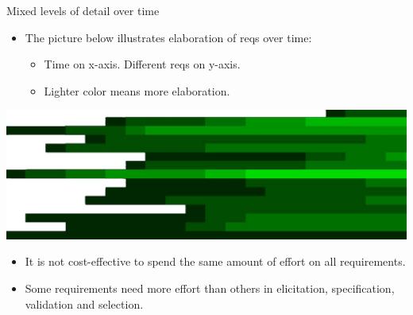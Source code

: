\begin{Slide}{Mixed levels of detail over time}

\begin{itemize}
\item The picture below illustrates elaboration of reqs over time:
\begin{itemize}
\item Time on x-axis. Different reqs on y-axis. 
\item Lighter color means more elaboration.

\end{itemize}
\end{itemize}
\begin{minipage}[t]{1.0\textwidth}
\vspace{-1.0em}\includegraphics[width=1.0\textwidth]{../img/details-time}
\end{minipage}

\begin{itemize}
\item It is not cost-effective to spend the same amount of effort on all requirements.

\item Some requirements need more effort than others in elicitation, specification, validation and selection.


\end{itemize}
\end{Slide}